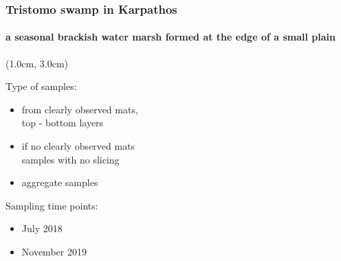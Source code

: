 \documentclass{beamer}
\begin{document}
   \begin{frame}
      \frametitle{Tristomo swamp in Karpathos}
      \framesubtitle{a seasonal brackish water marsh formed at the edge of a small plain}


      \begin{textblock*}{6cm}(1.0cm, 3.0cm)
         \small 

         Type of samples: 

         \begin{itemize}
            \item from clearly observed mats, \\ top - bottom layers
            \item if no clearly observed mats \\ samples with no slicing 
            \item aggregate samples
         \end{itemize}

         \bigskip

         Sampling time points: \\
         \begin{itemize}
            \item July 2018 
            \item November 2019
         \end{itemize}


      \end{textblock*}
   \end{frame}
\end{document}
